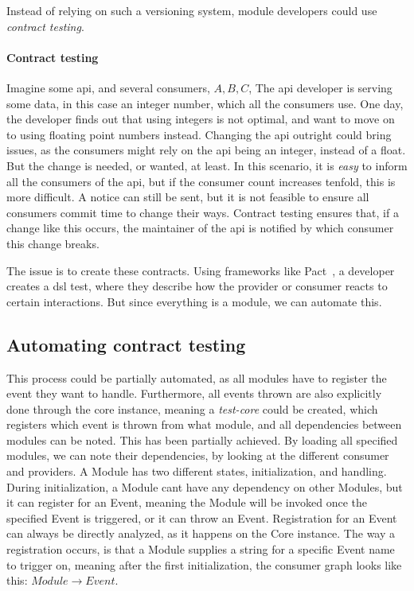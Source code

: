 Instead of relying on such a versioning system, module developers could use
\textit{contract testing}.

\paragraph{Contract testing} Imagine some \gls*{api}, and several consumers,
$A, B, C$, The \gls*{api} developer is serving some data, in this case an
integer number, which all the consumers use. One day, the developer finds out
that using integers is not optimal, and want to move on to using floating point
numbers instead. Changing the \gls*{api} outright could bring issues, as the
consumers might rely on the \gls*{api} being an integer, instead of a float. But
the change is needed, or wanted, at least. In this scenario, it is \textit{easy}
to inform all the consumers of the \gls*{api}, but if the consumer count
increases tenfold, this is more difficult. A notice can still be sent, but it is
not feasible to ensure all consumers commit time to change their ways. Contract
testing ensures that, if a change like this occurs, the maintainer of the
\gls*{api} is notified by which consumer this change breaks.

The issue is to create these contracts. Using frameworks like Pact~\cite{pact},
a developer creates a \gls*{dsl} test, where they describe how the provider or
consumer reacts to certain interactions. But since everything is a module, we
can automate this.

\subsection{Automating contract testing}

This process could be partially automated, as all modules have to register the
event they want to handle. Furthermore, all events thrown are also explicitly
done through the core instance, meaning a \textit{test-core} could be created,
which registers which event is thrown from what module, and all dependencies
between modules can be noted. This has been partially achieved. By loading all
specified modules, we can note their dependencies, by looking at the different
consumer and providers. A Module has two different states, initialization, and
handling. During initialization, a Module cant have any dependency on other
Modules, but it can register for an Event, meaning the Module will be invoked
once the specified Event is triggered, or it can throw an Event. Registration
for an Event can always be directly analyzed, as it happens on the Core
instance. The way a registration occurs, is that a Module supplies a string for
a specific Event name to trigger on, meaning after the first initialization, the
consumer graph looks like this: $Module \to Event$.

